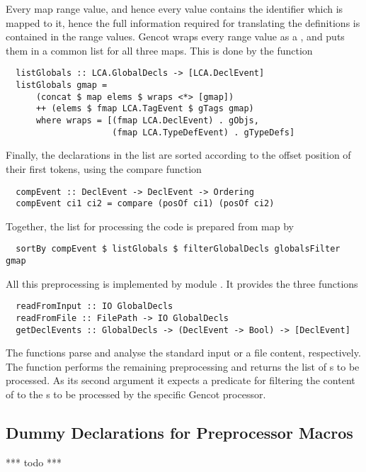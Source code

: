 Every map range value, and hence every  value contains the identifier which is mapped to it, 
hence the full information required for translating the definitions is contained in the range values. 
Gencot wraps every range value as a , and puts them in a common list for all three maps. This
is done by the function
\begin{verbatim}
  listGlobals :: LCA.GlobalDecls -> [LCA.DeclEvent]
  listGlobals gmap = 
      (concat $ map elems $ wraps <*> [gmap])
      ++ (elems $ fmap LCA.TagEvent $ gTags gmap)
      where wraps = [(fmap LCA.DeclEvent) . gObjs, 
                     (fmap LCA.TypeDefEvent) . gTypeDefs]
\end{verbatim}

Finally, the declarations in the list are sorted according to the offset position of their first tokens, using the
compare function
\begin{verbatim}
  compEvent :: DeclEvent -> DeclEvent -> Ordering
  compEvent ci1 ci2 = compare (posOf ci1) (posOf ci2)
\end{verbatim}

Together, the list for processing the code is prepared from map  by
\begin{verbatim}
  sortBy compEvent $ listGlobals $ filterGlobalDecls globalsFilter gmap
\end{verbatim}

All this preprocessing is implemented by module . It provides the three functions
\begin{verbatim}
  readFromInput :: IO GlobalDecls
  readFromFile :: FilePath -> IO GlobalDecls
  getDeclEvents :: GlobalDecls -> (DeclEvent -> Bool) -> [DeclEvent]
\end{verbatim}
The  functions parse and analyse the standard input or a file content, respectively. The function
 performs the remaining preprocessing and returns the list of s to be processed.
As its second argument it expects a predicate for filtering the content of  to the
s to be processed by the specific Gencot processor.

\subsection{Dummy Declarations for Preprocessor Macros}
\label{impl-ccode-dummydecl}

*** todo ***

